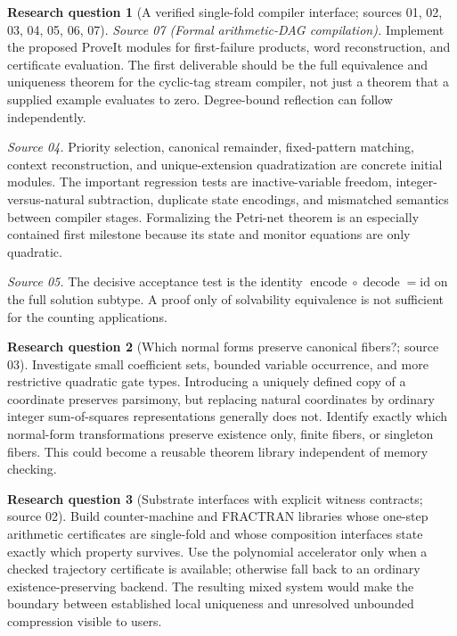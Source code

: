 \documentclass[11pt,a4paper]{article}
\theoremstyle{definition}
\newtheorem{question}[question]{Research question}
\theoremstyle{remark}
\begin{document}
\begin{question}[A verified single-fold compiler interface; sources 01, 02, 03, 04, 05, 06, 07]
\emph{Source 07 (Formal arithmetic-DAG compilation).}
Implement the proposed ProveIt modules for first-failure products, word reconstruction, and certificate evaluation. The first deliverable should be the full equivalence and uniqueness theorem for the cyclic-tag stream compiler, not just a theorem that a supplied example evaluates to zero. Degree-bound reflection can follow independently.
\end{question}

\emph{Source 04.} Priority selection, canonical remainder, fixed-pattern matching, context reconstruction, and unique-extension quadratization are concrete initial modules. The important regression tests are inactive-variable freedom, integer-versus-natural subtraction, duplicate state encodings, and mismatched semantics between compiler stages. Formalizing the Petri-net theorem is an especially contained first milestone because its state and monitor equations are only quadratic.

\emph{Source 05.} The decisive acceptance test is the identity $\operatorname{encode}\circ\operatorname{decode}=\mathrm{id}$ on the full solution subtype. A proof only of solvability equivalence is not sufficient for the counting applications.

\begin{question}[Which normal forms preserve canonical fibers?; source 03]
Investigate small coefficient sets, bounded variable occurrence, and more
restrictive quadratic gate types. Introducing a uniquely defined copy of a
coordinate preserves parsimony, but replacing natural coordinates by ordinary
integer sum-of-squares representations generally does not. Identify exactly
which normal-form transformations preserve existence only, finite fibers, or
singleton fibers. This could become a reusable theorem library independent of
memory checking.
\end{question}

\begin{question}[Substrate interfaces with explicit witness contracts; source 02]
Build counter-machine and FRACTRAN libraries whose one-step arithmetic
certificates are single-fold and whose composition interfaces state exactly
which property survives. Use the polynomial accelerator only when a
checked trajectory certificate is available; otherwise fall back to an
ordinary existence-preserving backend. The resulting mixed system would
make the boundary between established local uniqueness and unresolved
unbounded compression visible to users.
\end{question}
\end{document}
